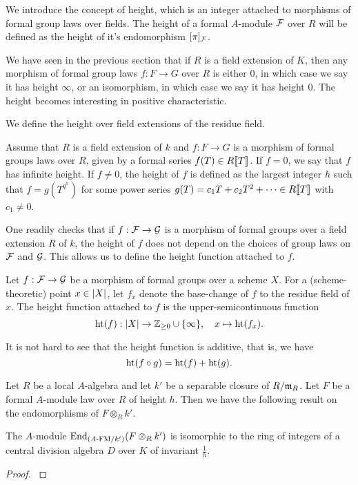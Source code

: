 We introduce the concept of height, which is an integer attached to
morphisms of formal group laws over fields. The height of a formal $A$-module
$\mathcal{F}$ over $R$ will be defined as the height of it's endomorphism $[\pi]_{\mathcal{F}}$. 

We have seen in the previous section that if $R$ is a field extension of $K$,
then any morphism of formal group laws $f: F \to G$ over $R$ is either $0$, in
which case we say it has height $\infty$, or an isomorphism, in which case we
say it has height $0$. The height becomes interesting in positive
characteristic. 

We define the height over field extensions of the residue field. 
\begin{defi}
  Assume that $R$ is a field extension of $k$ and $f: F \to G$ is a morphism of 
  formal groups laws over $R$, given by a formal series $f(T) \in R\llbracket T \rrbracket$. 
  If $f = 0$, we say that $f$ has infinite height. 
  If $f \neq 0$, the height of $f$ is defined as the largest integer $h$ such that 
  $f = g(T^{q^h})$ for some power series $g(T) = c_1 T + c_2 T^2 + \dots \in
  R\llbracket T \rrbracket$ with $c_1 \neq 0$. 
\end{defi}
One readily checks that if $f: \mathcal{F} \to \mathcal{G}$ is a morphism of formal groups over
a field extension $R$ of $k$, the height of $f$ does not depend on the choices
of group laws on $\mathcal{F}$ and $\mathcal{G}$. This allows us to define the height function 
attached to $f$. 
\begin{defi}
  Let $f: \mathcal{F} \to \mathcal{G}$ be a morphism of formal groups over a scheme $X$.
  For a (scheme-theoretic) point $x \in \lvert X \rvert$, let $f_x$ denote the 
  base-change of $f$ to the residue field of $x$. 
  The height function attached to $f$ is the upper-semicontinuous function
  \begin{equation} \label{eq:defheight}
    \textnormal{ht}(f) : \lvert X \rvert \to \mathbb{Z}_{\geq 0} \cup \{\infty\}, \quad x \mapsto 
    \textnormal{ht}(f_x).
  \end{equation}
\end{defi}
It is not hard to see that the height function is additive, that is, we have
\begin{equation*}
  \textnormal{ht}(f \circ g) = \textnormal{ht}(f) + \textnormal{ht}(g).
\end{equation*}

Let $R$ be a local $A$-algebra and let $k'$ be a separable closure of $R/\mathfrak{m}_R$.
Let $F$ be a formal $A$-module law over $R$ of height $h$. Then we have the
following result on the endomorphisms of $F \otimes_R k'$.
\begin{lem}
  The $A$-module $\operatorname{End}_{{({A}\text-\mathrm{FM}/{k'})}}(F \otimes_R k')$ is isomorphic to the ring
  of integers of a central division algebra $D$ over $K$ of invariant $\frac 1h$.
\begin{proof}
  \cite[Proposition 1.7]{drinfel1974elliptic} 
\end{proof}
\end{lem}

